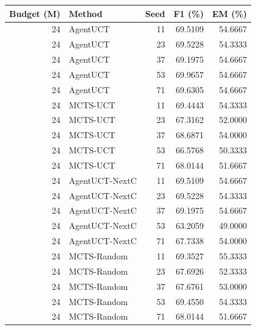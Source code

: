 \begin{tabular}{rlrrr}
\toprule
Budget (M) & Method & Seed & F1 (\%) & EM (\%) \\
\midrule
24 & AgentUCT & 11 & 69.5109 & 54.6667 \\
24 & AgentUCT & 23 & 69.5228 & 54.3333 \\
24 & AgentUCT & 37 & 69.1975 & 54.6667 \\
24 & AgentUCT & 53 & 69.9657 & 54.6667 \\
24 & AgentUCT & 71 & 69.6305 & 54.6667 \\
24 & MCTS-UCT & 11 & 69.4443 & 54.3333 \\
24 & MCTS-UCT & 23 & 67.3162 & 52.0000 \\
24 & MCTS-UCT & 37 & 68.6871 & 54.0000 \\
24 & MCTS-UCT & 53 & 66.5768 & 50.3333 \\
24 & MCTS-UCT & 71 & 68.0144 & 51.6667 \\
24 & AgentUCT-NextC & 11 & 69.5109 & 54.6667 \\
24 & AgentUCT-NextC & 23 & 69.5228 & 54.3333 \\
24 & AgentUCT-NextC & 37 & 69.1975 & 54.6667 \\
24 & AgentUCT-NextC & 53 & 63.2059 & 49.0000 \\
24 & AgentUCT-NextC & 71 & 67.7338 & 54.0000 \\
24 & MCTS-Random & 11 & 69.3527 & 55.3333 \\
24 & MCTS-Random & 23 & 67.6926 & 52.3333 \\
24 & MCTS-Random & 37 & 67.6761 & 53.0000 \\
24 & MCTS-Random & 53 & 69.4550 & 54.3333 \\
24 & MCTS-Random & 71 & 68.0144 & 51.6667 \\
\bottomrule
\end{tabular}
